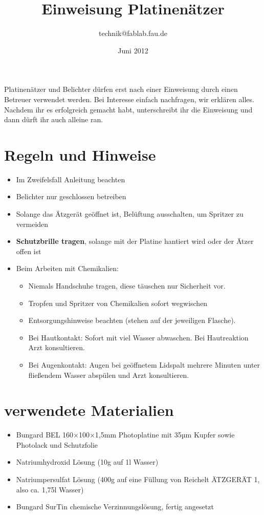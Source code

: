 \documentclass{\basedir/fablab-document}
\date{Juni 2012}
\author{technik@fablab.fau.de}
\title{Einweisung Platinenätzer}
\begin{document}
\dosecttoc
\faketableofcontents
{}

Platinenätzer und Belichter dürfen erst nach einer Einweisung durch einen Betreuer verwen\-det werden. Bei Interesse einfach nachfragen, wir erklären alles. Nachdem ihr es erfolgreich gemacht habt, unterschreibt ihr die Einweisung und dann dürft ihr auch alleine ran.

\section[Regeln und Hinweise]{Regeln und Hinweise}
\begin{itemize}
\item Im Zweifelsfall Anleitung beachten
\item Belichter nur geschlossen betreiben
\item Solange das Ätzgerät geöffnet ist, Belüftung ausschalten, um Spritzer zu vermeiden
\item \textbf{Schutzbrille tragen}, solange mit der Platine hantiert wird oder der Ätzer offen ist
\item Beim Arbeiten mit Chemikalien:

\begin{itemize}
\item Niemals Handschuhe tragen, diese täuschen nur Sicherheit vor.
\item Tropfen und Spritzer von Chemikalien sofort wegwischen
\item Entsorgungshinweise beachten (stehen auf der jeweiligen Flasche).
\item Bei Hautkontakt: Sofort mit viel Wasser abwaschen. Bei Hautreaktion Arzt konsultieren.
\item Bei Augenkontakt: Augen bei geöffnetem Lidspalt mehrere Minuten unter fließendem Wasser abspülen und Arzt konsultieren.
\end{itemize}
\end{itemize}
\section{verwendete Materialien}
\begin{itemize}
\item Bungard BEL 160×100×1,5mm Photoplatine mit 35µm Kupfer sowie Photolack und Schutzfolie
\item Natriumhydroxid Lösung (10g auf 1l Wasser)
\item Natriumpersulfat Lösung (400g auf eine Füllung von Reichelt ÄTZGERÄT 1, also ca. 1,75l Wasser)
\item Bungard SurTin chemische Verzinnungslösung, fertig angesetzt
\end{itemize}
\end{document}
